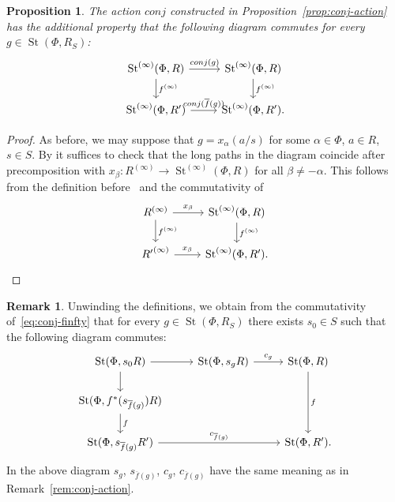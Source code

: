 \documentclass[oneside, 11pt]{amsart} \pdfoutput=1
\newcommand{\St}{\mathop{\mathrm{St}}\nolimits}
\numberwithin{equation}{section}
\newtheorem{prop}[lemma]{Proposition}
\theoremstyle{definition}
\newtheorem{rem}[lemma]{Remark}
\begin{document}
\begin{prop} \label{prop:functoriality}
 The action $conj$ constructed in Proposition~\ref{prop:conj-action} has the additional property that the following diagram commutes for every $g \in \St(\Phi, R_S)$:
 \begin{equation} \label{eq:conj-finfty} \begin{tikzcd} \St^{(\infty)}(\Phi, R) \ar{r}{conj(g)} \ar{d}{f^{(\infty)}} & \St^{(\infty)}(\Phi, R) \ar{d}{f^{(\infty)}} \\ \St^{(\infty)}(\Phi, R') \ar{r}{conj(\overline{f}(g))} & \St^{(\infty)}(\Phi, R'). \end{tikzcd} \end{equation}
\end{prop}
\begin{proof}
As before, we may suppose that \(g = x_\alpha(a/s)\) for some \(\alpha \in \Phi\), \(a \in R\), \(s \in S\). By \cite[Lemma~3.2]{LSV20} 
it suffices to check that the long paths in the diagram coincide after precomposition with \(x_\beta \colon R^{(\infty)} \to \St^{(\infty)}(\Phi, R)\) for all \(\beta \neq -\alpha\). This follows from the definition before~\cite[Proposition~4.2]{LSV20}
and the commutativity of
\[\begin{tikzcd}
R^{(\infty)} \ar{r}{x_\beta} \ar{d}{f^{(\infty)}} &
\St^{(\infty)}(\Phi, R) \ar{d}{f^{(\infty)}} \\
{R'}^{(\infty)} \ar{r}{x_\beta} & \St^{(\infty)}(\Phi, R'). \end{tikzcd}\]
\end{proof}

\begin{rem} \label{rem:functoriality}
 Unwinding the definitions, we obtain from the commutativity of~\eqref{eq:conj-finfty} that for every $g \in \St(\Phi, R_S)$ there exists $s_0 \in S$ such that the following diagram commutes:
 \[ \begin{tikzcd} \St(\Phi, s_0R) \ar{r} \ar{d} & \St(\Phi, s_g R) \ar{r}{c_{g}} & \St(\Phi, R) \ar{dd}{f} \\
                   \St(\Phi, f^*(s_{\overline{f}(g)})R) \ar{d}{f}   & & \\
                   \St(\Phi, s_{\overline{f}(g)} R')   \ar{rr}{c_{\overline{f}(g)}} & & \St(\Phi, R'). \end{tikzcd} \]
 In the above diagram $s_g$, $s_{\overline{f}(g)}$, $c_g$, $c_{\overline{f}(g)}$ have the same meaning as in Remark~\ref{rem:conj-action}.
\end{rem}
\end{document}
